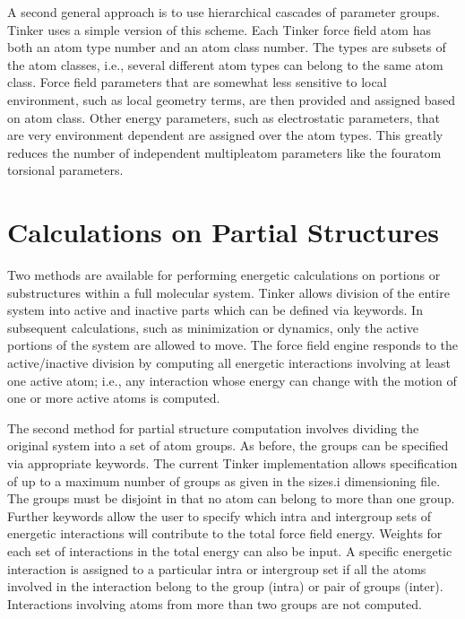 \documentclass[letterpaper,11pt,english]{sphinxmanual}
\begin{document}
\sphinxAtStartPar
A second general approach is to use hierarchical cascades of parameter groups. Tinker uses a simple version of this scheme. Each Tinker force field atom has both an atom type number and an atom class number. The types are subsets of the atom classes, i.e., several different atom types can belong to the same atom class. Force field parameters that are somewhat less sensitive to local environment, such as local geometry terms, are then provided and assigned based on atom class. Other energy parameters, such as electrostatic parameters, that are very environment dependent are assigned over the atom types. This greatly reduces the number of independent multiple\sphinxhyphen{}atom parameters like the four\sphinxhyphen{}atom torsional parameters.


\section{Calculations on Partial Structures}
\label{\detokenize{text/special-features:calculations-on-partial-structures}}
\sphinxAtStartPar
Two methods are available for performing energetic calculations on portions or substructures within a full molecular system. Tinker allows division of the entire system into active and inactive parts which can be defined via keywords. In subsequent calculations, such as minimization or dynamics, only the active portions of the system are allowed to move. The force field engine responds to the active/inactive division by computing all energetic interactions involving at least one active atom; i.e., any interaction whose energy can change with the motion of one or more active atoms is computed.

\sphinxAtStartPar
The second method for partial structure computation involves dividing the original system into a set of atom groups. As before, the groups can be specified via appropriate keywords. The current Tinker implementation allows specification of up to a maximum number of groups as given in the sizes.i dimensioning file. The groups must be disjoint in that no atom can belong to more than one group. Further keywords allow the user to specify which intra\sphinxhyphen{} and intergroup sets of energetic interactions will contribute to the total force field energy. Weights for each set of interactions in the total energy can also be input. A specific energetic interaction is assigned to a particular intra\sphinxhyphen{} or intergroup set if all the atoms involved in the interaction belong to the group (intra\sphinxhyphen{}) or pair of groups (inter\sphinxhyphen{}). Interactions involving atoms from more than two groups are not computed.
\end{document}
